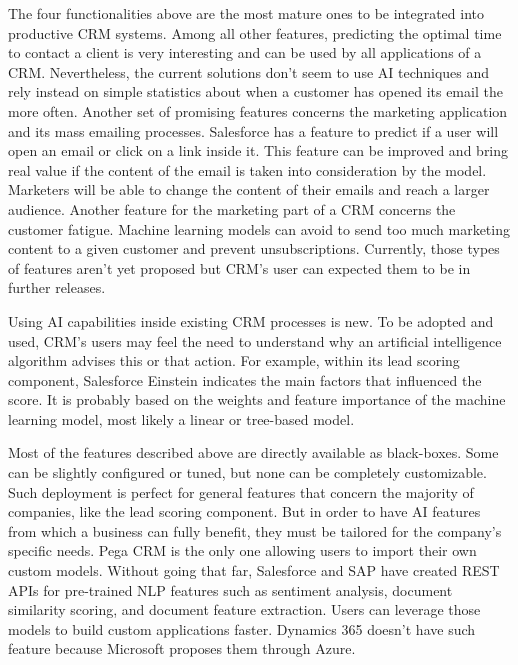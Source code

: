 The four functionalities above are the most mature ones to be integrated into productive CRM systems. Among all other features, predicting the optimal time to contact a client is very interesting and can be used by all applications of a CRM. Nevertheless, the current solutions don't seem to use AI techniques and rely instead on simple statistics about when a customer has opened its email the more often. Another set of promising features concerns the marketing application and its mass emailing processes. Salesforce has a feature to predict if a user will open an email or click on a link inside it. This feature can be improved and bring real value if the content of the email is taken into consideration by the model. Marketers will be able to change the content of their emails and reach a larger audience. Another feature for the marketing part of a CRM concerns the customer fatigue. Machine learning models can avoid to send too much marketing content to a given customer and prevent unsubscriptions. Currently, those types of features aren't yet proposed but CRM's user can expected them to be in further releases.

Using AI capabilities inside existing CRM processes is new. To be adopted and used, CRM's users may feel the need to understand why an artificial intelligence algorithm advises this or that action. For example, within its lead scoring component, Salesforce Einstein indicates the main factors that influenced the score. It is probably based on the weights and feature importance of the machine learning model, most likely a linear or tree-based model.

Most of the features described above are directly available as black-boxes. Some can be slightly configured or tuned, but none can be completely customizable. Such deployment is perfect for general features that concern the majority of companies, like the lead scoring component. But in order to have AI features from which a business can fully benefit, they must be tailored for the company's specific needs. Pega CRM is the only one allowing users to import their own custom models. Without going that far, Salesforce and SAP have created REST APIs for pre-trained NLP features such as sentiment analysis, document similarity scoring, and document feature extraction. Users can leverage those models to build custom applications faster. Dynamics 365 doesn't have such feature because Microsoft proposes them through Azure.


